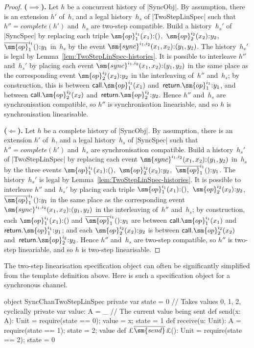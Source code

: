 \begin{proof}
\textbf{($\implies$).}\quad
%
Let $h$ be a concurrent history of |SyncObj|.  By assumption, there is an
extension $h'$ of~$h$, and a legal history~$h_s$ of |TwoStepLinSpec| such that
$h'' = complete(h')$ and~$h_s$ are two-step compatible.
%
Build a history~$h_s'$ of |SyncSpec| by replacing each triple
$\sm{op}_1^{i_1}(x_1) \:: ()$,\, $\sm{op}_2^{i_2}(x_2) \:: y_2$,\,
$\overline{\sm{op}}_1^{i_1}() \:: y_1$ in~$h_s$ by the event
$\sm{sync}^{i_1,i_2}(x_1,x_2) \:: (y_1,y_2)$.  
%
The history~$h_s'$ is legal by Lemma~\ref{lem:TwoStepLinSpec-histories}.  
%
It is possible to interleave $h''$ and~$h_s'$ by placing each event
$\sm{sync}^{i_1,i_2}(x_1,x_2) \:: (y_1,y_2)$ in the same place as the
corresponding event $\sm{op}_2^{i_2}(x_2) \:: y_2$ in the interleaving
of~$h''$ and~$h_s$; by construction, this is between
$\call.\sm{op}_1^{i_1}(x_1)$ and~$\return.\sm{op}_1^{i_1} \:: y_1$, and
between $\call.\sm{op}_2^{i_2}(x_2)$ and~$\return.\sm{op}_2^{i_2} \:: y_2$.
%
Hence $h''$ and~$h_s$ are synchronisation compatible, so $h''$ is
synchronisation lineariable, and so $h$ is synchronisation linearisable.


\textbf{($\Leftarrow$).}\quad
%
Let $h$ be a complete history of |SyncObj|.  By assumption, there is an
extension $h'$ of~$h$, and a legal history~$h_s$ of |SyncSpec| such that $h''
= complete(h')$ and~$h_s$ are synchronisation compatible.
%
Build a history~$h_s'$ of |TwoStepLinSpec| by replacing each event
$\sm{sync}^{i_1,i_2}(x_1,x_2) \:: (y_1,y_2)$ in~$h_s$ by the three events
$\sm{op}_1^{i_1}(x_1) \:: ()$,\, $\sm{op}_2^{i_2}(x_2) \:: y_2$,\,
$\overline{\sm{op}}_1^{i_1}() \:: y_1$.
%
The history~$h_s'$ is legal by Lemma~\ref{lem:TwoStepLinSpec-histories}.
%
It is possible to interleave $h''$ and~$h_s'$ by placing each triple
$\sm{op}_1^{i_1}(x_1) \:: ()$,\, $\sm{op}_2^{i_2}(x_2) \:: y_2$,\,
$\overline{\sm{op}}_1^{i_1}() \:: y_1$ in the same place as the corresponding
event $\sm{sync}^{i_1,i_2}(x_1,x_2) \:: (y_1,y_2)$ in the interleaving
of~$h''$ and~$h_s$; by construction, each $\sm{op}_1^{i_1}(x_1) \:: ()$ and
$\overline{\sm{op}}_1^{i_1}() \:: y_1$ are between
$\call.\sm{op}_1^{i_1}(x_1)$ and~$\return.\sm{op}_1^{i_1} \:: y_1$; and each
$\sm{op}_2^{i_2}(x_2) \:: y_2$ is between $\call.\sm{op}_2^{i_2}(x_2)$
and~$\return.\sm{op}_2^{i_2} \:: y_2$.
%
Hence $h''$ and~$h_s$ are two-step compatible, so $h''$ is two-step
lineariable, and so $h$ is two-step linearisable.
\end{proof}


The two-step linearisation specification object can often be significantly
simplified from the template definition above.  Here is such a specification
object for a synchronous channel.
%
\begin{scala}
object SyncChanTwoStepLinSpec{
  private var state = 0        // Takes values 0, 1, 2, cyclically 
  private var value: A = _    // The current value being sent
  def send(x: A): Unit = { require(state == 0); value = x; state = 1 }
  def receive(u: Unit): A = { require(state == 1); state = 2; value }
  def £$\overline{\sm{send}}$£(): Unit = { require(state == 2); state = 0 }
}
\end{scala}
